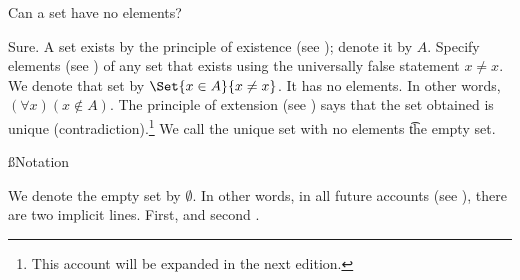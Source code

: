 

Can a set have no elements?


Sure.
A set exists by the principle of existence (see ); denote it by $A$.
Specify elements (see ) of any set that exists using the universally false statement $x \neq x$.
We denote that set by $\Set{x \in A}{x \neq x}$.
It has no elements.
In other words, $(\forall x)(x \not \in A)$.
The principle of extension (see ) says that the set obtained is unique (contradiction).\footnote{This account will be expanded in the next edition.}
	We call the unique set with no elements \t{the empty set}.



%
%

\ss{Notation}

We denote the empty set by $\emptyset$.
In other words, in all future accounts (see ), there are two implicit lines. First,  and second .

